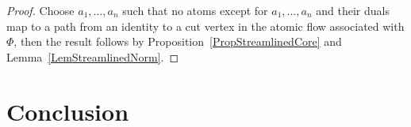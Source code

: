 \documentclass[a4paper]{amsart}
\theoremstyle{definition}
\theoremstyle{remark}
\begin{document}
\begin{proof}
Choose $a_1,\dots,a_n$ such that no atoms except for $a_1,\dots,a_n$ and their duals map to a path from an identity to a cut vertex in the atomic flow associated with $\Phi$, then the result follows by Proposition~\ref{PropStreamlinedCore} and Lemma~\ref{LemStreamlinedNorm}.
\end{proof}

\section{Conclusion}



\end{document}
